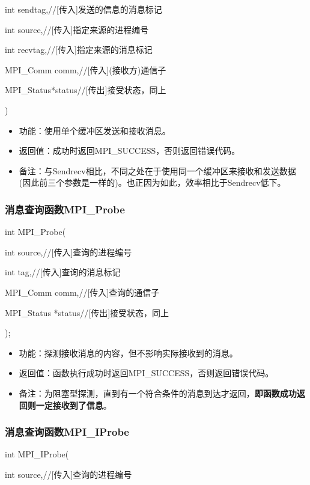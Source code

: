 \documentclass[UTF8]{article}%
\begin{document}
    \qquad int sendtag,//[传入]发送的信息的消息标记

    \qquad int source,//[传入]指定来源的进程编号

    \qquad int recvtag,//[传入]指定来源的消息标记

    \qquad MPI\_Comm comm,//[传入](接收方)通信子

    \qquad MPI\_Status*status//[传出]接受状态，同上

)

\begin{itemize}
    \item 功能：使用单个缓冲区发送和接收消息。
    \item 返回值：成功时返回MPI\_SUCCESS，否则返回错误代码。
    \item 备注：与Sendrecv相比，不同之处在于使用同一个缓冲区来接收和发送数据(因此前三个参数是一样的)。也正因为如此，效率相比于Sendrecv低下。
\end{itemize}

\subsubsection{消息查询函数MPI\_Probe}

int MPI\_Probe(

    \qquad int         source,//[传入]查询的进程编号

    \qquad int         tag,//[传入]查询的消息标记

    \qquad MPI\_Comm   comm,//[传入]查询的通信子

    \qquad MPI\_Status *status//[传出]接受状态，同上

);

\begin{itemize}
    \item 功能：探测接收消息的内容，但不影响实际接收到的消息。
    \item 返回值：函数执行成功时返回MPI\_SUCCESS，否则返回错误代码。
    \item 备注：为阻塞型探测，直到有一个符合条件的消息到达才返回，\textbf{即函数成功返回则一定接收到了信息}。
\end{itemize}

\subsubsection{消息查询函数MPI\_IProbe}

int MPI\_IProbe(

    \qquad int         source,//[传入]查询的进程编号
\end{document}
